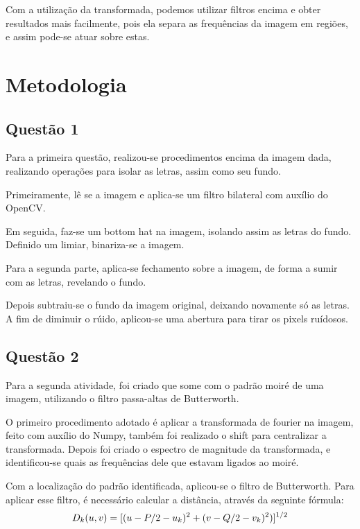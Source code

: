 \documentclass[conference]{IEEEtran}
\begin{document}
Com a utilização da transformada, podemos utilizar filtros encima e obter resultados mais facilmente,
pois ela separa as frequências da imagem em regiões, e assim pode-se atuar sobre estas.

\section{Metodologia}
\subsection{Questão 1}

Para a primeira questão, realizou-se procedimentos encima da imagem dada, realizando operações para isolar as letras, assim como seu fundo.

Primeiramente, lê se a imagem e aplica-se um filtro bilateral com auxílio do OpenCV. 

Em seguida, faz-se um bottom hat na imagem, isolando assim as letras do fundo. Definido um limiar,
binariza-se a imagem.

Para a segunda parte, aplica-se fechamento sobre a imagem, de forma a sumir com as letras, revelando
o fundo. 

Depois subtraiu-se o fundo da imagem original, deixando novamente só as letras. 
A fim de diminuir o rúido, aplicou-se uma abertura para tirar os pixels ruídosos.

\subsection{Questão 2}

Para a segunda atividade, foi criado que some com o padrão moiré de uma imagem,
utilizando o filtro passa-altas de Butterworth.

O primeiro procedimento adotado é aplicar a transformada de fourier na imagem, feito
com auxílio do Numpy, também foi realizado o shift para centralizar a transformada. Depois foi criado o espectro de magnitude da transformada, e identificou-se
quais as frequências dele que estavam ligados ao moiré.

Com a localização do padrão identificada, aplicou-se o filtro de Butterworth. Para aplicar esse filtro, é necessário
calcular a distância, através da seguinte fórmula:
\begin{equation}
    \label{eq5}
    \centering
    D_{k}(u,v) = [(u - P/2 - u_{k})^2 + (v - Q/2 - v_{k})^2)]^{1/2}
\end{equation}
\end{document}
